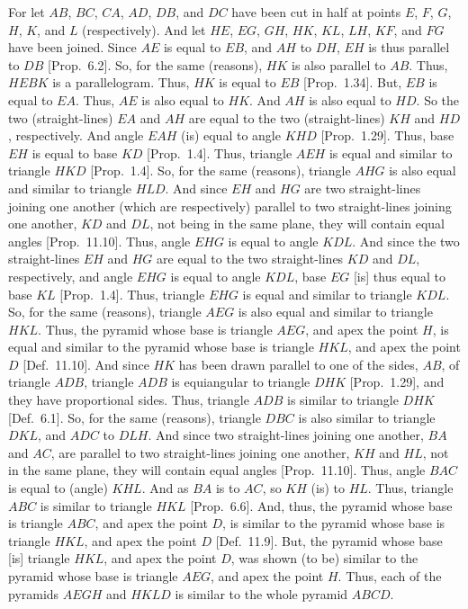 For let $AB$, $BC$, $CA$, $AD$, $DB$, and $DC$ have been cut in half at points $E$, $F$, $G$,
$H$, $K$, and $L$ (respectively). And let $HE$, $EG$, $GH$, $HK$, $KL$, $LH$, $KF$, and $FG$
have been joined. Since $AE$ is equal to $EB$, and $AH$ to $DH$, $EH$ is thus parallel to
$DB$ [Prop.~6.2]. So, for the same (reasons), $HK$ is also parallel
to $AB$. Thus, $HEBK$ is a parallelogram. Thus, $HK$ is equal to $EB$ [Prop.~1.34]. But, $EB$ is equal to $EA$. Thus, $AE$ is also equal to $HK$. And $AH$
is also equal to $HD$. So the two (straight-lines) $EA$ and $AH$ are equal to the two
(straight-lines) $KH$ and $HD$, respectively. And angle $EAH$ (is) equal to angle
$KHD$ [Prop.~1.29]. Thus, base $EH$ is equal to base $KD$ [Prop.~1.4]. Thus, triangle $AEH$ is equal and similar to triangle $HKD$
[Prop.~1.4]. So, for the same (reasons), triangle $AHG$
is also equal and similar to triangle $HLD$. And since $EH$ and $HG$ are two
straight-lines joining one another (which are respectively) parallel to two straight-lines
joining one another, $KD$ and $DL$, not being in the same plane, they will contain
equal angles [Prop.~11.10]. Thus, angle $EHG$ is equal to angle
$KDL$. And since the two straight-lines $EH$ and $HG$ are equal to the two straight-lines
$KD$ and $DL$, respectively, and angle $EHG$ is equal to angle $KDL$, base $EG$
[is] thus equal to base $KL$ [Prop.~1.4]. Thus, triangle $EHG$ is equal
and similar to triangle $KDL$. So, for the same (reasons), triangle $AEG$ is also equal and
similar to triangle $HKL$. Thus, the pyramid whose base is triangle $AEG$,
and apex the point $H$, is equal and similar to the pyramid whose base is triangle $HKL$,
and apex the point $D$ [Def.~11.10]. And since $HK$ has been drawn
parallel to one of the sides, $AB$, of triangle $ADB$, triangle $ADB$
is equiangular to triangle $DHK$ [Prop.~1.29], and they have proportional sides. Thus, triangle $ADB$ is similar to triangle $DHK$ [Def.~6.1].
So, for the same (reasons), triangle $DBC$ is also similar to triangle $DKL$, and
$ADC$ to $DLH$. And since two straight-lines joining one another, $BA$ and $AC$, are parallel
to two straight-lines joining one another, $KH$ and $HL$, not in the same plane, they will
contain equal angles [Prop.~11.10]. Thus, angle $BAC$ is equal
to (angle) $KHL$. And as $BA$ is to $AC$, so $KH$ (is) to $HL$. Thus, triangle $ABC$ is
similar to triangle $HKL$ [Prop.~6.6]. And, thus, the pyramid whose base is triangle $ABC$, and apex
the point $D$, is similar to the pyramid whose base is triangle $HKL$, and apex the point $D$ [Def.~11.9]. But,
the pyramid whose base [is] triangle $HKL$, and apex the point $D$, was shown (to be) similar
to the pyramid whose base is triangle $AEG$, and apex the point $H$. Thus, each of the pyramids
$AEGH$ and $HKLD$ is similar to the whole pyramid $ABCD$.

